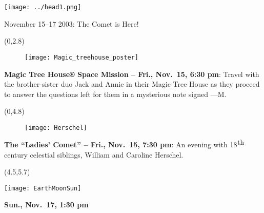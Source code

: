 \documentclass{article}
\begin{document}
\texttt{[image: ../head1.png]}
   {\fontsize{28}{8}
   \begin{centering}

   November 15–17 2003: The Comet is Here!

   \end{centering}
}
   

\begin{textblock}{4.2}(0,2.8)

   {\fontsize{19}{21}

   \begin{wrapfigure}{l}{0.9in}

          \texttt{[image: Magic\_treehouse\_poster]}
       
       \end{wrapfigure}      

       \textbf{Magic Tree House® Space Mission – Fri., Nov.~15, 6:30 pm}: Travel with the brother-sis\-ter duo 
       Jack and
       Annie in their Magic Tree House as they pro\-ceed to an\-swer the questions left
       for them in a mysterious note signed —M. 
       
       }

\end{textblock}

\begin{textblock}{4.0}(0,4.8)
   \begin{wrapfigure}[12]{l}{2in}
      \texttt{[image: Herschel]}
   \end{wrapfigure}      

   {\fontsize{20}{32}
   \textbf{The “Ladies’ Com\-et” – Fri., Nov.~15, 7:30 pm}:
   An even\-ing with 18$^{\hbox{th}}$ century celestial siblings, Wil\-liam and Caroline
   Herschel. 

   }

\end{textblock}


 \begin{textblock}{3.2}(4.5,5.7)

   {\fontsize{16}{17}

   \texttt{[image: EarthMoonSun]}

   \textbf{Sun., Nov.~17, 1:30 pm}

   }

\end{textblock}
\end{document}
